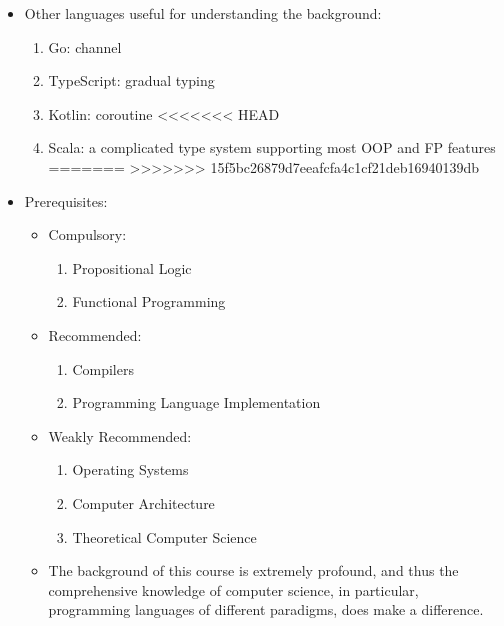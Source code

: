 \documentclass{article}
\begin{document}
\begin{itemize}
\begin{itemize}
\begin{itemize}
\begin{itemize}
\begin{enumerate}
                        \end{enumerate}
                        \item Other languages useful for understanding the background:
                        \begin{enumerate}
                            \item Go: channel
                            \item TypeScript: gradual typing
                            \item Kotlin: coroutine
<<<<<<< HEAD
                            \item Scala: a complicated type system supporting most OOP and FP features
=======
>>>>>>> 15f5bc26879d7eeafcfa4c1cf21deb16940139db
                        \end{enumerate}
                        \item Prerequisites:
                        \begin{itemize}
                            \item Compulsory:
                            \begin{enumerate}
                                \item Propositional Logic
                                \item Functional Programming
                            \end{enumerate}
                            \item Recommended:
                            \begin{enumerate}
                                \item Compilers
                                \item Programming Language Implementation
                            \end{enumerate}
                            \item Weakly Recommended:
                            \begin{enumerate}
                                \item Operating Systems
                                \item Computer Architecture
                                \item Theoretical Computer Science
                            \end{enumerate}
                            \item The background of this course is extremely profound, and thus the comprehensive knowledge of computer science, in particular, programming languages of different paradigms, does make a difference.
                        \end{itemize}


\end{itemize}
\end{itemize}
\end{itemize}
\end{itemize}
\end{document}

